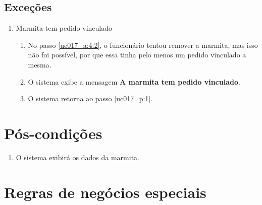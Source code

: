\subsection{Exceções}

\begin{enumerate}[label=E\arabic*]
	\item Marmita tem pedido vinculado \label{uc017_e:1}
	\begin{enumerate}[label*=.\arabic*]
		\item[] No passo \ref{uc017_a:4:2}, o funcionário tentou remover a marmita, mas isso não foi possível, por que essa tinha pelo menos um pedido vinculado a mesma.
		\item O sistema exibe a mensagem \textbf{A marmita tem pedido vinculado}.
		\item O sistema retorna ao passo \ref{uc017_p:1}.
	\end{enumerate}
\end{enumerate}

\section{Pós-condições}

\begin{enumerate}
	\item O sistema exibirá os dados da marmita.	
\end{enumerate}

\section{Regras de negócios especiais}

